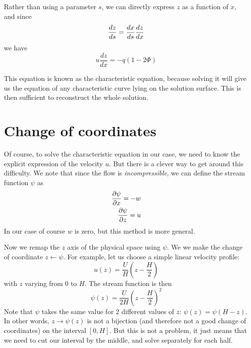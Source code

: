 Rather than using a parameter $s$, we can directly express $z$ as a function of $x$, and since 
\begin{equation}
	\frac{d {z}}{d {s}} = \frac{d {x}}{d {s}} \frac{d z}{d x} 
\end{equation} 
we have
\begin{equation} \label{eq:charac}
	u \frac{d z}{d x} =  - q (1- 2 \Phi)
\end{equation}

This equation is known as the characteristic equation, because solving it will give us the equation of any characteristic curve lying on the solution surface. 
This is then sufficient to reconstruct the whole solution.

\section{Change of coordinates}

Of course, to solve the characteristic equation in our case, we need to know the explicit expression of the velocity $u$. But there is a clever way to get around this difficulty.
We note that since the flow is \textit{incompressible}, we can define the stream function $\psi$ as
\begin{align}
	\frac{\partial {\psi}}{\partial {x}} = - w \\
	\frac{\partial {\psi}}{\partial {z}} = u
\end{align}
In our case of course $w$ is zero, but this method is more general.

Now we remap the $z$ axis of the physical space using $\psi$. We we make the change of coordinate $z \leftarrow \psi$.
For example, let us choose a simple linear velocity profile:
\begin{equation}
	u(z) = \frac{U}{H} \left( z - \frac{H}{2} \right)
\end{equation}
with $z$ varying from 0 to $H$. The stream function is then
\begin{equation}
	\psi(z) = \frac{U}{2H} \left( z - \frac{H}{2} \right) ^2
\end{equation}
Note that $\psi$ takes the same value for 2 different values of $z$: $\psi(z) = \psi(H - z)$.
In other words, $z \rightarrow \psi(z)$ is not a bijection (and therefore not a good change of coordinates) on the interval $[0, H]$. But this is not a problem, it just means that we need to cut our interval by the middle, and solve separately for each half.

